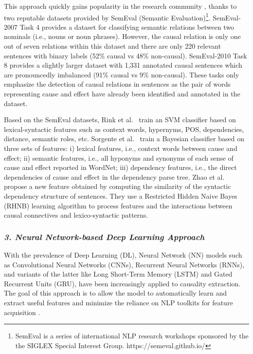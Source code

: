 This approach quickly gains popularity in the research community \cite{Sorgente13}, thanks to two reputable datasets provided by SemEval (Semantic Evaluation)\footnote{SemEval is a series of international NLP research workshops sponsored by the the SIGLEX Special Interest Group. https://semeval.github.io/}. SemEval-2007 Task 4 \cite{SemEval07Task4} provides a dataset for classifying semantic relations between two nominals (i.e., nouns or noun phrases). However, the causal relation is only one out of seven relations within this dataset and there are only 220 relevant sentences with binary labels (52\% causal vs 48\% non-causal). SemEval-2010 Task 8 \cite{SemEval10Task8} provides a slightly larger dataset with 1,331 annotated causal sentences which are pronouncedly imbalanced (91\% causal vs 9\% non-causal). These tasks only emphasize the detection of causal relations in sentences as the pair of words representing cause and effect have already been identified and annotated in the dataset. 

Based on the SemEval datasets, Rink et al.~\cite{Rink10} train an SVM classifier based on lexical-syntactic features such as context words, hypernyms, POS, dependencies, distance, semantic roles, etc.  Sorgente et al.~\cite{Sorgente13} train a Bayesian classifier based on three sets of features: i) lexical features, i.e., context words between cause and effect; ii) semantic features, i.e., all hyponyms and synonyms of each sense of cause and effect reported in WordNet; iii) dependency features, i.e., the direct dependencies of cause and effect in the dependency parse tree.  Zhao et al.~\cite{Zhao16} propose a new feature obtained by computing the similarity of the syntactic dependency structure of sentences. They use a Restricted Hidden Naive Bayes (RHNB) learning algorithm to process features and the interactions between causal connectives and lexico-syntactic patterns.


\subsubsection {\emph{3. Neural Network-based Deep Learning Approach}}

With the prevalence of Deep Learning (DL), Neural Network (NN) models such as Convolutional Neural Networks (CNNs), Recurrent Neural Networks (RNNs), and variants of the latter like Long Short-Term Memory (LSTM) and Gated Recurrent Units (GRU), have been increasingly applied to causality extraction. The goal of this approach is to allow the model to automatically learn and extract useful features and minimize the reliance on NLP toolkits for feature acquisition \cite{Yang21Survey,Ali21Survey}.

